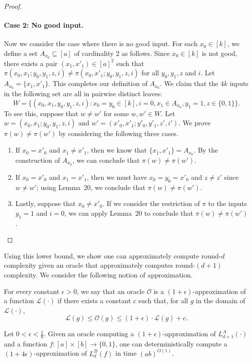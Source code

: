 \begin{proof}
\paragraph{Case 2: No good input.} Now we consider the case where there is no good input. For each $x_0\in[k]$, we define a set $A_{x_0}\subseteq[a]$ of cardinality 2 as follows. Since $x_0\in[k]$ is not good, there exists a pair $(x_1,x'_1)\in[a]^2$ such that $\pi(x_0,x_1;y_0,y_1,z,i)\ne\pi(x_0,x'_1;y_0,y_1,z,i)$ for all $y_0,y_1,z$ and $i$. Let $A_{x_0}=\{x_1,x'_1\}$. This completes our definition of $A_{x_0}$.
We claim that the $4k$ inputs in the following set are all in pairwise distinct leaves:
\[W=\{(x_0,x_1,y_0,y_1,z,i):x_0=y_0\in[k],i=0,x_1\in A_{x_0},y_1=1,z\in\{0,1\}\}.\]
To see this, suppose that $w\ne w'$ for some $w,w'\in W$. Let $w=(x_0,x_1;y_0,y_1,z,i)$ and $w'=(x'_0,x'_1;y'_0,y'_1,z',i')$. We prove $\pi(w)\ne\pi(w')$ by considering the following three cases.
\begin{enumerate}
\item If $x_0=x'_0$ and $x_1\ne x'_1$, then we know that $\{x_1,x'_1\}=A_{x_0}$. By the construction of $A_{x_0}$, we can conclude that $\pi(w)\ne\pi(w')$.
\item If $x_0=x'_0$ and $x_1=x'_1$, then we must have $x_0=y_0=x'_0$ and $z\ne z'$ since $w\ne w'$; using Lemma~20, we conclude that $\pi(w)\ne\pi(w')$.
\item Lastly, suppose that $x_0\ne x'_0$. If we consider the restriction of $\pi$ to the inputs $y_1=1$ and $i=0$, we can apply Lemma~20 to conclude that $\pi(w)\ne\pi(w')$.
\end{enumerate}
\end{proof}
Using this lower bound, we show one can approximately compute round-$d$ complexity given an oracle that approximately computes round-$(d+1)$ complexity. We consider the following notion of approximation.
\begin{definition}
For every constant $\epsilon>0$, we say that an oracle $\mathcal O$ is a $(1+\epsilon)$-approximation of a function $\mathcal L(\cdot)$ if there exists a constant $c$ such that, for all $g$ in the domain of $\mathcal L(\cdot)$,
\[\mathcal L(g)\le\mathcal O(g)\le(1+\epsilon)\cdot\mathcal L(g)+c.\]
\end{definition}
\begin{corollary}\label{cor:approx-elimination}
Let $0<\epsilon<\frac18$. Given an oracle computing a $(1+\epsilon)$-approximation of $L_{d+1}^A(\cdot)$ and a function $f:[a]\times[b]\to\{0,1\}$, one can deterministically compute a $(1+4\epsilon)$-approximation of $L_d^B(f)$ in time $(ab)^{O(1)}$.
\end{corollary}

